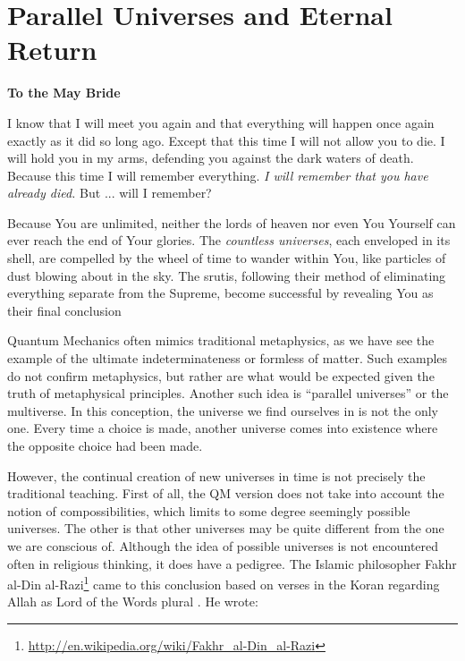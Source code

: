 \section{Parallel Universes and Eternal Return}

\textbf{To the May Bride}

\begin{quotex}
I know that I will meet you again and that everything will happen once again exactly as it did so long ago. Except that this time I will not allow you to die. I will hold you in my arms, defending you against the dark waters of death. Because this time I will remember everything. \emph{I will remember that you have already died.} But ... will I remember?


Because You are unlimited, neither the lords of heaven nor even You Yourself can ever reach the end of Your glories. The \emph{countless universes}, each enveloped in its shell, are compelled by the wheel of time to wander within You, like particles of dust blowing about in the sky. The srutis, following their method of eliminating everything separate from the Supreme, become successful by revealing You as their final conclusion 
\end{quotex}


Quantum Mechanics often mimics traditional metaphysics, as we have see the example of the ultimate indeterminateness or formless of matter. Such examples do not confirm metaphysics, but rather are what would be expected given the truth of metaphysical principles. Another such idea is ``parallel universes'' or the multiverse. In this conception, the universe we find ourselves in is not the only one. Every time a choice is made, another universe comes into existence where the opposite choice had been made.

However, the continual creation of new universes in time is not precisely the traditional teaching. First of all, the QM version does not take into account the notion of compossibilities, which limits to some degree seemingly possible universes. The other is that other universes may be quite different from the one we are conscious of. Although the idea of possible universes is not encountered often in religious thinking, it does have a pedigree. The Islamic philosopher Fakhr al-Din al-Razi\footnote{\url{http://en.wikipedia.org/wiki/Fakhr\_al-Din\_al-Razi}} came to this conclusion based on verses in the Koran regarding Allah as Lord of the Words plural . He wrote:

